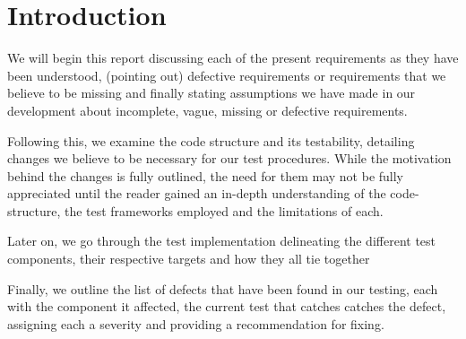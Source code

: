 \section*{Introduction}

We will begin this report discussing each of the present requirements as they have been understood, (pointing out) defective requirements or requirements that we believe to be missing and finally stating assumptions we have made in our development about incomplete, vague, missing or defective requirements. 
\par

Following this, we examine the code structure and its testability, detailing changes we believe to be necessary for our test procedures. 
While the motivation behind the changes is fully outlined, the need for them may not be fully appreciated until the reader gained an in-depth understanding of the code-structure, the test frameworks employed and the limitations of each. 
\par

Later on, we go through the test implementation delineating the different test components, their respective targets and how they all tie together
\par

Finally, we outline the list of defects that have been found in our testing, each with the component it affected, the current test that catches catches the defect, assigning each a severity and providing a recommendation for fixing.   
